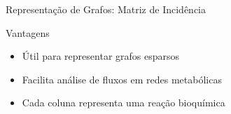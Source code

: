 \begin{frame}[shrink=5]{Representação de Grafos: Matriz de Incidência}

\vspace{0.3cm}

\begin{exampleblock}{Vantagens}
\begin{itemize}
    \item Útil para representar grafos esparsos
    \item Facilita análise de fluxos em redes metabólicas
    \item Cada coluna representa uma reação bioquímica
\end{itemize}
\end{exampleblock}
\end{frame}

